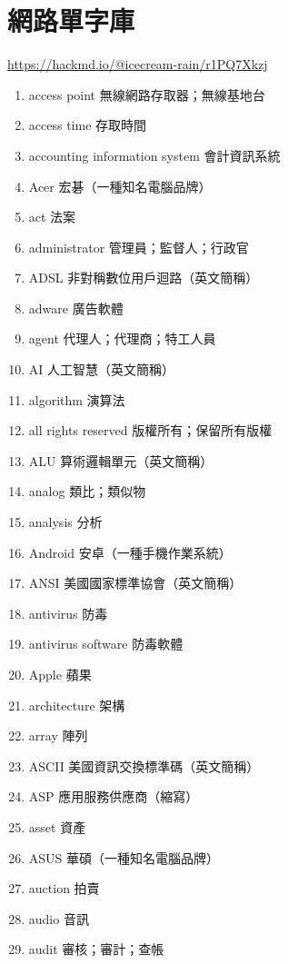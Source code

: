 \chapter{網路單字庫}


\url{https://hackmd.io/@icecream-rain/r1PQ7Xkzj}

\clearpage

\begin{enumerate}
  \item access point 無線網路存取器；無線基地台
  \item access time 存取時間
  \item accounting information system 會計資訊系統
  \item Acer 宏碁（一種知名電腦品牌）
  \item act 法案
  \item administrator 管理員；監督人；行政官
  \item ADSL 非對稱數位用戶迴路（英文簡稱）
  \item adware 廣告軟體
  \item agent 代理人；代理商；特工人員
  \item AI 人工智慧（英文簡稱）
  \item algorithm 演算法
  \item all rights reserved 版權所有；保留所有版權
  \item ALU 算術邏輯單元（英文簡稱）
  \item analog 類比；類似物
  \item analysis 分析
  \item Android 安卓（一種手機作業系統）
  \item ANSI 美國國家標準協會（英文簡稱）
  \item antivirus 防毒
  \item antivirus software 防毒軟體
  \item Apple 蘋果
  \item architecture 架構
  \item array 陣列
  \item ASCII 美國資訊交換標準碼（英文簡稱）
  \item ASP 應用服務供應商（縮寫）
  \item asset 資產
  \item ASUS 華碩（一種知名電腦品牌）
  \item auction 拍賣
  \item audio 音訊
  \item audit 審核；審計；查帳

\end{enumerate}
